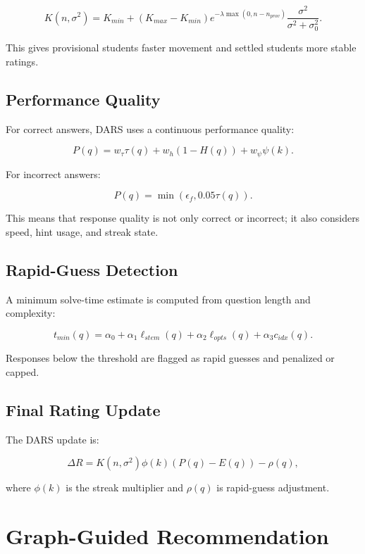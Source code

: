 \documentclass[12pt,a4paper]{report}
\begin{document}
\begin{equation}
K(n,\sigma^2)=K_{min}+(K_{max}-K_{min})e^{-\lambda \max(0,n-n_{prov})}
\frac{\sigma^2}{\sigma^2+\sigma_0^2}.
\end{equation}

This gives provisional students faster movement and settled students more stable ratings.

\section{Performance Quality}
For correct answers, DARS uses a continuous performance quality:

\begin{equation}
P(q)=w_\tau\tau(q)+w_h(1-H(q))+w_\psi\psi(k).
\end{equation}

For incorrect answers:

\begin{equation}
P(q)=\min(\epsilon_f,0.05\tau(q)).
\end{equation}

This means that response quality is not only correct or incorrect; it also considers speed, hint usage, and streak state.

\section{Rapid-Guess Detection}
A minimum solve-time estimate is computed from question length and complexity:

\begin{equation}
t_{min}(q)=\alpha_0+\alpha_1\ell_{stem}(q)+\alpha_2\ell_{opts}(q)+\alpha_3c_{idx}(q).
\end{equation}

Responses below the threshold are flagged as rapid guesses and penalized or capped.

\section{Final Rating Update}
The DARS update is:

\begin{equation}
\Delta R = K(n,\sigma^2)\phi(k)(P(q)-E(q))-\rho(q),
\end{equation}

where $\phi(k)$ is the streak multiplier and $\rho(q)$ is rapid-guess adjustment.

\chapter{Graph-Guided Recommendation}
\end{document}
